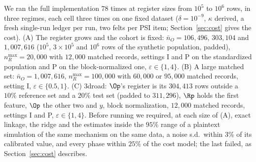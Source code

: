 We ran the full implementation $78$ times at register sizes from $10^5$ to $10^6$ rows, in three regimes, each cell three times on one fixed dataset ($\delta = 10^{-9}$, $\kappa$ derived, a fresh single-run ledger per run, two felts per PSI item; Section~\ref{sec:cost} gives the cost). (A) The register grows and the cohort is fixed: $\bar n_O = 106{,}496$, $303{,}104$ and $1{,}007{,}616$ ($10^5$, $3 \times 10^5$ and $10^6$ rows of the synthetic population, padded), $n_R^{\max} = 20{,}000$ with $12{,}000$ matched records, settings I and P on the standardized population and P on the block-normalized one, $\varepsilon \in \{1, 4\}$. (B) A large matched set: $\bar n_O = 1{,}007{,}616$, $n_R^{\max} = 100{,}000$ with $60{,}000$ or $95{,}000$ matched records, setting I, $\varepsilon \in \{0.5, 1\}$. (C) 3droad: $\Op$'s register is its $304{,}413$ rows outside a $10\%$ reference set and a $20\%$ test set (padded to $311{,}296$), $\Rp$ holds the first feature, $\Op$ the other two and $y$, block normalization, $12{,}000$ matched records, settings I and P, $\varepsilon \in \{1, 4\}$. Before running we required, at each size of (A), exact linkage, the ridge and the estimates inside the $95\%$ range of a plaintext simulation of the same mechanism on the same data, a noise s.d.\ within $3\%$ of its calibrated value, and every phase within $25\%$ of the cost model; the last failed, as Section~\ref{sec:cost} describes.
